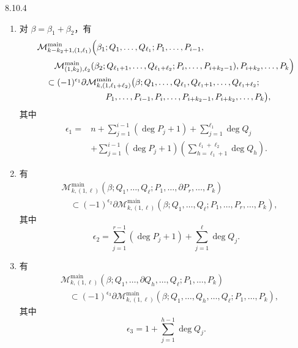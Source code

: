 \begin{proposition}{8.10.4}\label{prop:8-10-4}
\begin{enumerate}[label=(\arabic*),leftmargin=2.8em]
\item 对 $\beta=\beta_1+\beta_2$，有
\[
\begin{aligned}
&\mathcal M_{k-k_2+1,(1,\ell_1)}^{\mathrm{main}}
\Bigl(\beta_1;Q_1,\ldots,Q_{\ell_1};P_1,\ldots,P_{i-1},\\
&\qquad
\mathcal M_{(1,k_2),\ell_2}^{\mathrm{main}}
(\beta_2;Q_{\ell_1+1},\ldots,Q_{\ell_1+\ell_2};
P_i,\ldots,P_{i+k_2-1}),P_{i+k_2},\ldots,P_k\Bigr)\\
&\quad\subset(-1)^{\epsilon_1}\partial
\mathcal M_{k,(1,\ell_1+\ell_2)}^{\mathrm{main}}
\bigl(\beta;Q_1,\ldots,Q_{\ell_1},Q_{\ell_1+1},\ldots,Q_{\ell_1+\ell_2};\\
&\hspace{8em}
P_1,\ldots,P_{i-1},P_i,\ldots,P_{i+k_2-1},P_{i+k_2},\ldots,P_k\bigr),
\end{aligned}
\]
其中
\[
\begin{aligned}
 \epsilon_1={}&n+
 \sum_{j=1}^{i-1}(\deg P_j+1)
 +\sum_{j=1}^{\ell_1}\deg Q_j\\
 &+\sum_{j=1}^{i-1}(\deg P_j+1)
 \left(\sum_{h=\ell_1+1}^{\ell_1+\ell_2}\deg Q_h\right).
\end{aligned}
\]

\item 有
\[
\begin{aligned}
&\mathcal M_{k,(1,\ell)}^{\mathrm{main}}
(\beta;Q_1,\ldots,Q_\ell;P_1,\ldots,\partial P_r,\ldots,P_k)\\
&\quad\subset(-1)^{\epsilon_2}\partial
\mathcal M_{k,(1,\ell)}^{\mathrm{main}}
(\beta;Q_1,\ldots,Q_\ell;P_1,\ldots,P_r,\ldots,P_k),
\end{aligned}
\]
其中
\[
 \epsilon_2=\sum_{j=1}^{r-1}(\deg P_j+1)
 +\sum_{j=1}^{\ell}\deg Q_j.
\]

\item 有
\[
\begin{aligned}
&\mathcal M_{k,(1,\ell)}^{\mathrm{main}}
(\beta;Q_1,\ldots,\partial Q_h,\ldots,Q_\ell;P_1,\ldots,P_k)\\
&\quad\subset(-1)^{\epsilon_3}\partial
\mathcal M_{k,(1,\ell)}^{\mathrm{main}}
(\beta;Q_1,\ldots,Q_h,\ldots,Q_\ell;P_1,\ldots,P_k),
\end{aligned}
\]
其中
\[
 \epsilon_3=1+\sum_{j=1}^{h-1}\deg Q_j.
\]
\end{enumerate}
\end{proposition}
